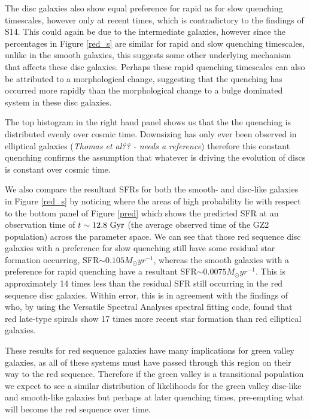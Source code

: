 \documentclass[useAMS,usenatbib]{mn2e}
\def\changed    {\color{titlecol} }
\begin{document}
{\changed The disc galaxies also show equal preference for rapid as for slow quenching timescales, however only at recent times, which is contradictory to the findings of S14. This could again be due to the intermediate galaxies, however since the percentages in Figure \ref{red_s} are similar for rapid and slow quenching timescales, unlike in the smooth galaxies, this suggests some other underlying mechanism that affects these disc galaxies. Perhaps these rapid quenching timescales can also be attributed to a morphological change, suggesting that the quenching has occurred more rapidly than the morphological change to a bulge dominated system in these disc galaxies. 

The top histogram in the right hand panel shows us that the the quenching is distributed evenly over cosmic time. Downsizing has only ever been observed in elliptical galaxies (\emph{Thomas et al?? - needs a reference}) therefore this constant quenching confirms the assumption that whatever is driving the evolution of discs is constant over cosmic time.  }

We also compare the resultant SFRs for both the smooth- and disc-like galaxies in Figure \ref{red_s} by noticing {\changed where the areas of high probability lie with respect to the bottom panel of Figure \ref{pred} which shows the predicted SFR at an observation time of $t\sim12.8~\rm{Gyr}$ (the average observed time of the GZ2 population) across the parameter space}. We can see that those red sequence disc galaxies with a preference for slow quenching still have some residual star formation occurring, SFR$\sim0.105 M_{\odot}yr^{-1}$, whereas the smooth galaxies with a preference for rapid quenching have a resultant SFR$\sim0.0075 M_{\odot}yr^{-1}$. This is approximately 14 times less than the residual SFR still occurring in the red sequence disc galaxies. Within error, this is in agreement with the findings of \citet{Toj13} who, by using the Versatile Spectral Analyses spectral fitting code, found that red late-type spirals show 17 times more recent star formation than red elliptical galaxies.

These results for red sequence galaxies have many implications for green valley galaxies, as all of these systems must have passed through this region on their way to the red sequence. Therefore if the green valley is a transitional population we expect to see a similar distribution of likelihoods for the green valley disc-like and smooth-like galaxies but perhaps at later quenching times, pre-empting what will become the red sequence over time. 
\end{document}
